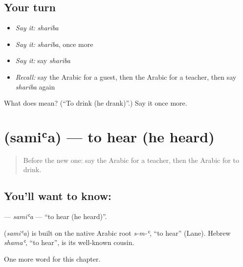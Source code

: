 \subsection*{Your turn}
\begin{itemize}
\raggedright
  \item \emph{Say it:} \emph{shariba}
  \item \emph{Say it:} \emph{shariba}, once more
  \item \emph{Say it:} say \emph{shariba}
  \item \emph{Recall:} say the Arabic for a guest, then the Arabic for a teacher, then say \emph{shariba} again
\end{itemize}

\begin{tcolorbox}[breakable,colback=teal!4,colframe=teal!35!black,title={Before you move on}]
What does  mean? (\textquotedblleft{}To drink (he drank)\textquotedblright{}.) Say it once more.
\end{tcolorbox}
\section[\texorpdfstring{\ar{سمع} (samiʿa)}{سمع (samiʿa)}]{ (samiʿa) — to hear (he heard)}

\label{lesson:AR-C57-samia}



\begin{quote}
Before the new one: say the Arabic for a teacher, then the Arabic for to drink.
\end{quote}

\subsection*{You'll want to know: }
\textbf{} — \emph{samiʿa} — \textquotedblleft{}to hear (he heard)\textquotedblright{}.

\begin{cousinweb}
\textbf{} (\emph{samiʿa}) is built on the native Arabic root \emph{s-m-ʿ}, \textquotedblleft{}to hear\textquotedblright{} (Lane). Hebrew \emph{shamaʿ}, \textquotedblleft{}to hear\textquotedblright{}, is its well-known cousin.
\end{cousinweb}

\begin{grammarlens}[title={What you've built}]
One more word for this chapter.
\end{grammarlens}

